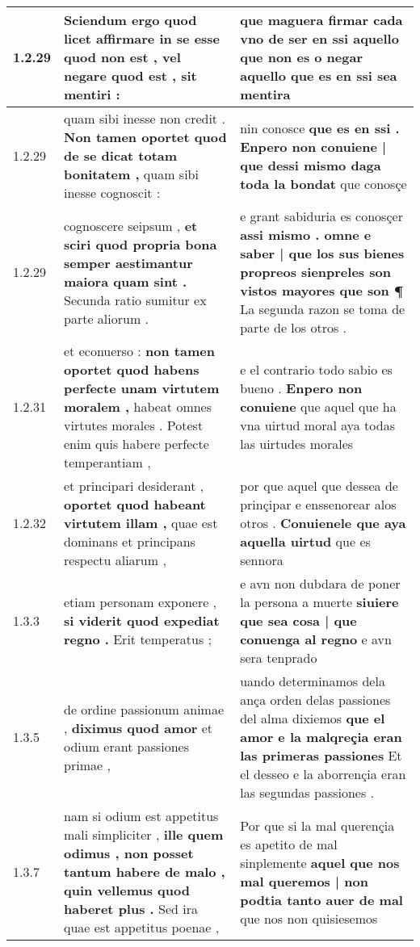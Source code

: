 \begin{tabular}{|p{1cm}|p{6.5cm}|p{6.5cm}|}
1.2.29 & Sciendum ergo quod licet affirmare in se esse quod non est , \textbf{ vel negare quod est , } sit mentiri : & que maguera firmar cada vno de ser \textbf{ en ssi aquello que non es o negar aquello que es } en ssi sea mentira \\\hline
1.2.29 & quam sibi inesse non credit . \textbf{ Non tamen oportet quod de se dicat totam bonitatem , } quam sibi inesse cognoscit : & nin conosce \textbf{ que es en ssi . Enpero non conuiene | que dessi mismo daga toda la bondat } que conosçe \\\hline
1.2.29 & cognoscere seipsum , \textbf{ et sciri quod propria bona semper aestimantur maiora quam sint . } Secunda ratio sumitur ex parte aliorum . & e grant sabiduria es conosçer \textbf{ assi mismo . omne e saber | que los sus bienes propreos sienpreles son vistos mayores que son ¶ } La segunda razon se toma de parte de los otros . \\\hline
1.2.31 & et econuerso : \textbf{ non tamen oportet quod habens perfecte unam virtutem moralem , } habeat omnes virtutes morales . Potest enim quis habere perfecte temperantiam , & e el contrario todo sabio es bueno . \textbf{ Enpero non conuiene } que aquel que ha vna uirtud moral aya todas las uirtudes morales \\\hline
1.2.32 & et principari desiderant , \textbf{ oportet quod habeant virtutem illam , } quae est dominans et principans respectu aliarum , & por que aquel que dessea de prinçipar e enssenorear alos otros . \textbf{ Conuienele que aya aquella uirtud } que es sennora \\\hline
1.3.3 & etiam personam exponere , \textbf{ si viderit quod expediat regno . } Erit temperatus ; & e avn non dubdara de poner la persona a muerte \textbf{ siuiere que sea cosa | que conuenga al regno } e avn sera tenprado \\\hline
1.3.5 & de ordine passionum animae , \textbf{ diximus quod amor } et odium erant passiones primae , & uando determinamos dela ança orden delas passiones del alma dixiemos \textbf{ que el amor e la malqreçia eran las primeras passiones } Et el desseo e la aborrençia eran las segundas passiones . \\\hline
1.3.7 & nam si odium est appetitus mali simpliciter , \textbf{ ille quem odimus , non posset tantum habere de malo , quin vellemus quod haberet plus . } Sed ira quae est appetitus poenae , & Por que si la mal querençia es apetito de mal sinplemente \textbf{ aquel que nos mal queremos | non podtia tanto auer de mal } que nos non quisiesemos \\\hline

\end{tabular}
